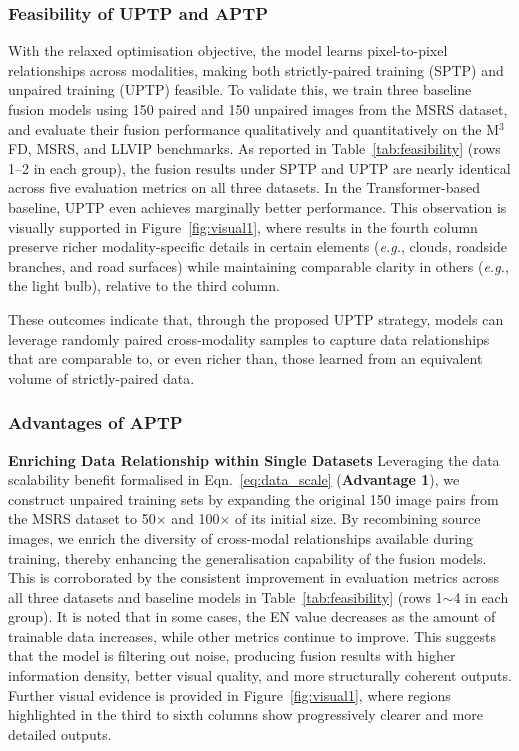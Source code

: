 \subsubsection{Feasibility of UPTP and APTP}
With the relaxed optimisation objective, the model learns pixel-to-pixel relationships across modalities, making both strictly-paired training (SPTP) and unpaired training (UPTP) feasible. 
To validate this, we train three baseline fusion models using 150 paired and 150 unpaired images from the MSRS dataset, and evaluate their fusion performance qualitatively and quantitatively on the M$^3$FD, MSRS, and LLVIP benchmarks.
As reported in Table~\ref{tab:feasibility} (rows 1–2 in each group), the fusion results under SPTP and UPTP are nearly identical across five evaluation metrics on all three datasets. 
In the Transformer-based baseline, UPTP even achieves marginally better performance. 
This observation is visually supported in Figure~\ref{fig:visual1}, where results in the fourth column preserve richer modality-specific details in certain elements (\textit{e.g.}, clouds, roadside branches, and road surfaces) while maintaining comparable clarity in others (\textit{e.g.}, the light bulb), relative to the third column.

These outcomes indicate that, through the proposed UPTP strategy, models can leverage randomly paired cross-modality samples to capture data relationships that are comparable to, or even richer than, those learned from an equivalent volume of strictly-paired data.



\subsubsection{Advantages of APTP}
\noindent\textbf{Enriching Data Relationship within Single Datasets}
Leveraging the data scalability benefit formalised in Eqn.~\eqref{eq:data_scale} (\textbf{Advantage 1}), we construct unpaired training sets by expanding the original 150 image pairs from the MSRS dataset to 50$\times$ and 100$\times$ of its initial size. 
By recombining source images, we enrich the diversity of cross-modal relationships available during training, thereby enhancing the generalisation capability of the fusion models.
This is corroborated by the consistent improvement in evaluation metrics across all three datasets and baseline models in Table~\ref{tab:feasibility} (rows 1$\sim$4 in each group). 
It is noted that in some cases, the EN value decreases as the amount of trainable data increases, while other metrics continue to improve. 
This suggests that the model is filtering out noise, producing fusion results with higher information density, better visual quality, and more structurally coherent outputs. 
Further visual evidence is provided in Figure~\ref{fig:visual1}, where regions highlighted in the third to sixth columns show progressively clearer and more detailed outputs.

